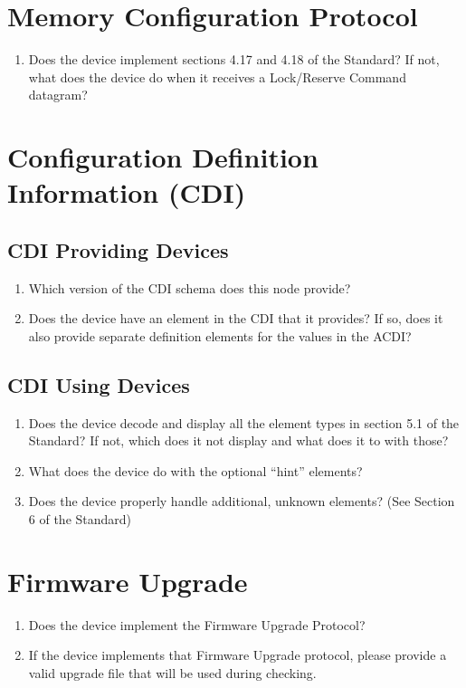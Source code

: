 \section{Memory Configuration Protocol}
    \begin{enumerate}
        \item Does the device implement sections 4.17 and 4.18 of the Standard?
              If not, what does the device do when it receives a Lock/Reserve Command 
              datagram?
    \end{enumerate}

\section{Configuration Definition Information (CDI)}
    \subsection{CDI Providing Devices}
        \begin{enumerate}
            \item Which version of the CDI schema does this node provide?
            \item Does the device have an  element in the CDI that it provides?
                If so, does it also provide separate definition elements for the
                values in the ACDI?
        \end{enumerate}
    \subsection{CDI Using Devices}
        \begin{enumerate}
            \item Does the device decode and display all the element types in section 
                    5.1 of the Standard? If not, which does it not display
                    and what does it to with those?
            \item What does the device do with the optional ``hint'' elements?
            \item Does the device properly handle additional, unknown elements? 
                    (See Section 6 of the Standard)
        \end{enumerate}

\section{Firmware Upgrade}
    \begin{enumerate}
        \item Does the device implement the Firmware Upgrade Protocol?
        \item If the device implements that Firmware Upgrade protocol,
                please provide a valid upgrade file that will be used
                during checking.
    \end{enumerate}

